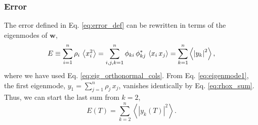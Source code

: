 \documentclass[reprint, superscriptaddress, floatfix]{revtex4-1}
\newcommand{\Err}{E}
\begin{document}
\subsubsection{Error}



The error defined in Eq. \eqref{eq:error_def}
can be rewritten in terms of the eigenmodes of $\mathbf w$,
%
\begin{align}
  \Err
  \equiv
  \sum_{i = 1}^n \rho_i \,
    \left\langle x_i^2 \right\rangle
  =
  \sum_{i, j, k=1}^n \phi_{ki} \, \phi_{kj}^* \,
    \left\langle x_i \, x_j \right\rangle
  =
  \sum_{k = 1}^n
    \left\langle
      \left| y_k \right|^2
    \right\rangle
  ,
\notag
\end{align}
%
where we have used Eq. \eqref{eq:eig_orthonormal_cols}.
%
From Eq. \eqref{eq:eigenmode1},
the first eigenmode,
$y_1 = \sum_{j=1}^n \rho_j \, x_j$,
vanishes identically by Eq. \eqref{eq:rhox_sum}.
%
Thus, we can start the last sum %
from $k = 2$,
%
\begin{equation}
  \Err(T)
  =
  \sum_{k = 2}^n
    \left\langle
      \left| y_k(T) \right|^2
    \right\rangle
  .
\label{eq:y2_sum}
\end{equation}
\end{document}
